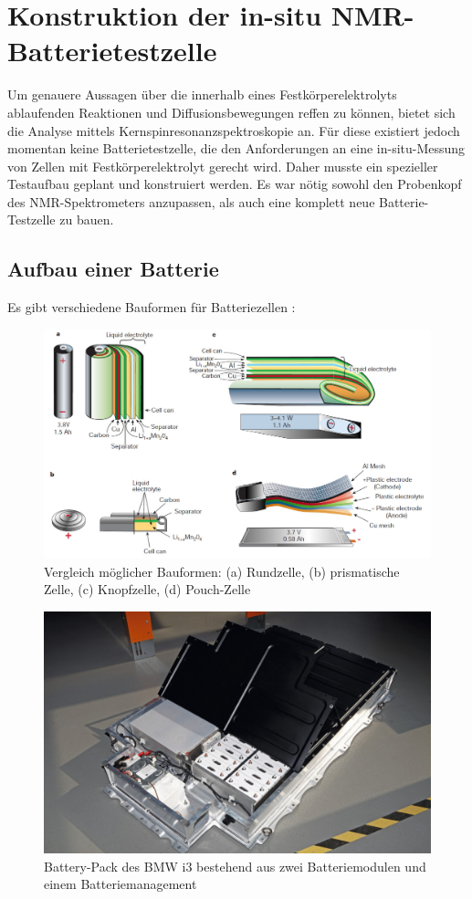 \documentclass[a4paper, 11pt, headsepline,footsepline,twoside,abstract]{scrbook}
\begin{document}

\chapter{Konstruktion der in-situ NMR-Batterietestzelle}
Um genauere Aussagen über die innerhalb eines Festkörperelektrolyts ablaufenden Reaktionen und Diffusionsbewegungen reffen zu können, bietet sich die Analyse mittels Kernspinresonanzspektroskopie an. Für diese existiert jedoch momentan keine Batterietestzelle, die den Anforderungen an eine in-situ-Messung von Zellen mit Festkörperelektrolyt gerecht wird. Daher musste ein spezieller Testaufbau geplant und konstruiert werden. Es war nötig sowohl den Probenkopf des NMR-Spektrometers anzupassen, als auch eine komplett neue Batterie-Testzelle zu bauen.
\section{Aufbau einer Batterie}
Es gibt verschiedene Bauformen für Batteriezellen \cite{tarascon2001issues}:
\begin{figure}
	\centering
	\includegraphics[width=1.0\columnwidth]{images/uebersicht_bauformen.jpg}
	\caption{Vergleich möglicher Bauformen: (a) Rundzelle, (b) prismatische Zelle, (c) Knopfzelle, (d) Pouch-Zelle \cite{tarascon2001issues}}
	\label{vergleich_zellform}
\end{figure}
\begin{figure}
	\centering
	\includegraphics[width=0.9\columnwidth]{images/bmw-i3-battery-pack.jpg}
	\caption{Battery-Pack des BMW i3 bestehend aus zwei Batteriemodulen und einem Batteriemanagement \cite{bmwblog}}
	\label{battery_pack}
\end{figure}
\end{document}
